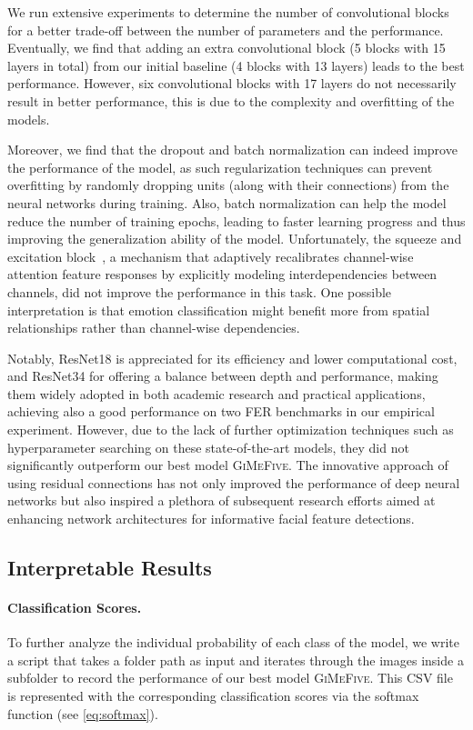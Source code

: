 We run extensive experiments to determine the number of convolutional blocks for a better trade-off between the number of parameters and the performance. 
Eventually, we find that adding an extra convolutional block 
(5 blocks with 15 layers in total) from our initial baseline (4 blocks with 13 layers)
leads to the best performance. 
However, six convolutional blocks with 17 layers do not necessarily result in better performance, 
this is due to the complexity and overfitting of the models. 

Moreover, 
we find that the dropout and batch normalization can indeed improve the performance of the model, 
as such regularization techniques can prevent overfitting by randomly dropping units 
(along with their connections) from the neural networks during training. 
Also, %
batch normalization can help the model reduce the number of training epochs, 
leading to faster learning progress and thus improving the generalization ability of the model. 
Unfortunately, the squeeze and excitation block~\cite{HuSASW20}, 
a mechanism that adaptively recalibrates channel-wise attention feature responses by explicitly modeling interdependencies between channels, 
did not improve the performance in this task. 
One possible interpretation is that emotion classification might benefit more from spatial relationships rather than channel-wise dependencies. 

Notably, 
ResNet18 is appreciated for its efficiency and lower computational cost, 
and ResNet34 for offering a balance between depth and performance, 
making them widely adopted in both academic research and practical applications, 
achieving also a good performance on two FER benchmarks in our empirical experiment. 
However, due to the lack of further optimization techniques such as hyperparameter searching on these state-of-the-art models, 
they did not significantly outperform our best model \textsc{GiMeFive}. 
The innovative approach of using residual connections has not only improved the performance of deep neural networks 
but also inspired a plethora of subsequent research efforts aimed at enhancing network architectures for informative facial feature detections.

\subsection{Interpretable Results}
\label{sec:evaluation:inter}

\paragraph{Classification Scores.} 
To further analyze the individual probability of each class of the model, 
we write a script that takes a folder path as input and iterates through the images inside a subfolder to record the performance of our best model \textsc{GiMeFive}. 
This CSV file is represented with the corresponding classification scores via the softmax function (see \cref{eq:softmax}). 

